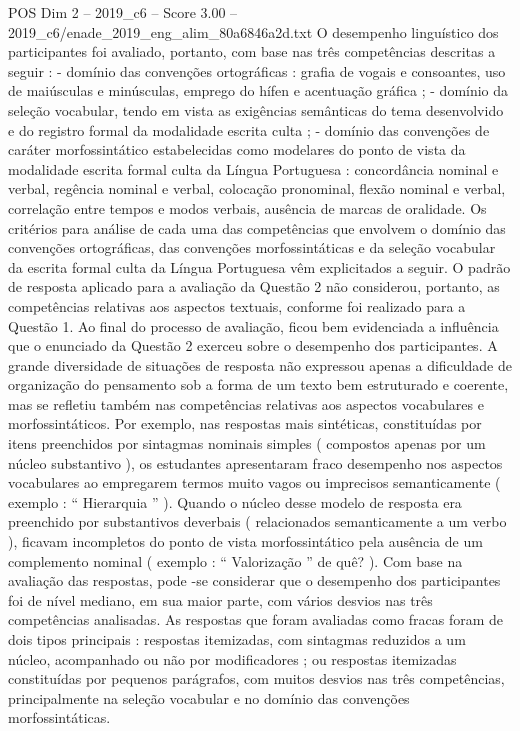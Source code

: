 \begin{textsample}{POS Dim 2 – 2019\_c6 – Score 3.00 – 2019\_c6/enade\_2019\_eng\_alim\_80a6846a2d.txt}
O desempenho linguístico dos participantes foi avaliado, portanto, com base nas três competências descritas a seguir : - domínio das convenções ortográficas : grafia de vogais e consoantes, uso de maiúsculas e minúsculas, emprego do hífen e acentuação gráfica ; - domínio da seleção vocabular, tendo em vista as exigências semânticas do tema desenvolvido e do registro formal da modalidade escrita culta ; - domínio das convenções de caráter morfossintático estabelecidas como modelares do ponto de vista da modalidade escrita formal culta da Língua Portuguesa : concordância nominal e verbal, regência nominal e verbal, colocação pronominal, flexão nominal e verbal, correlação entre tempos e modos verbais, ausência de marcas de oralidade.
Os critérios para análise de cada uma das competências que envolvem o domínio das convenções ortográficas, das convenções morfossintáticas e da seleção vocabular da escrita formal culta da Língua Portuguesa vêm explicitados a seguir.
O padrão de resposta aplicado para a avaliação da Questão 2 não considerou, portanto, as competências relativas aos aspectos textuais, conforme foi realizado para a Questão 1.
Ao final do processo de avaliação, ficou bem evidenciada a influência que o enunciado da Questão 2 exerceu sobre o desempenho dos participantes.
A grande diversidade de situações de resposta não expressou apenas a dificuldade de organização do pensamento sob a forma de um texto bem estruturado e coerente, mas se refletiu também nas competências relativas aos aspectos vocabulares e morfossintáticos.
Por exemplo, nas respostas mais sintéticas, constituídas por itens preenchidos por sintagmas nominais simples ( compostos apenas por um núcleo substantivo ), os estudantes apresentaram fraco desempenho nos aspectos vocabulares ao empregarem termos muito vagos ou imprecisos semanticamente ( exemplo : “ Hierarquia ” ).
Quando o núcleo desse modelo de resposta era preenchido por substantivos deverbais ( relacionados semanticamente a um verbo ), ficavam incompletos do ponto de vista morfossintático pela ausência de um complemento nominal ( exemplo : “ Valorização ” de quê? ).
Com base na avaliação das respostas, pode -se considerar que o desempenho dos participantes foi de nível mediano, em sua maior parte, com vários desvios nas três competências analisadas.
As respostas que foram avaliadas como fracas foram de dois tipos principais : respostas itemizadas, com sintagmas reduzidos a um núcleo, acompanhado ou não por modificadores ; ou respostas itemizadas constituídas por pequenos parágrafos, com muitos desvios nas três competências, principalmente na seleção vocabular e no domínio das convenções morfossintáticas.

\end{textsample}
